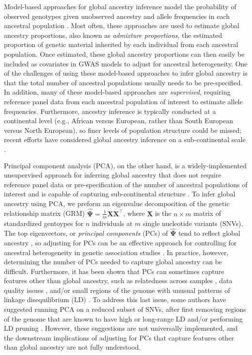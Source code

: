 \documentclass[12pt]{article}
\begin{document}
Model-based approaches for global ancestry inference model the probability of observed genotypes given unobserved ancestry and allele frequencies in each ancestral population \citep{structure, tang2005, admixture, finestructure}. 
Most often, these approaches are used to estimate global ancestry proportions, also known as \textit{admixture proportions}, the estimated proportion of genetic material inherited by each individual from each ancestral population. 
Once estimated, these global ancestry proportions can then easily be included as covariates in GWAS models to adjust for ancestral heterogeneity.
One of the challenges of using these model-based approaches to infer global ancestry is that the total number of ancestral populations usually needs to be pre-specified. 
In addition, many of these model-based approaches are \textit{supervised}, requiring reference panel data from each ancestral population of interest to estimate allele frequencies.
Furthermore, ancestry inference is typically conducted at a continental level (e.g., African versus European, rather than South European versus North European), so finer levels of population structure could be missed; recent efforts have considered global ancestry inference on a sub-continental scale \citep{finestructure, durand2014}.

Principal component analysis (PCA), on the other hand, is a widely-implemented unsupervised approach for inferring global ancestry that does not require reference panel data or pre-specification of the number of ancestral populations of interest and is capable of capturing sub-continental structure \citep{novembre2008}. 
To infer global ancestry using PCA, we preform an eigenvalue decomposition of the genetic relationship matrix (GRM) $\hat{\boldsymbol\Psi} = \frac{1}{m} \mathbf{X} \mathbf{X}^\top$, where $\mathbf{X}$ is the $n \times m$ matrix of standardized gentoypes for $n$ individuals at $m$ single nucleotide variants (SNVs).
The top eigenvectors, or \textit{principal components} (PCs) of $\hat{\boldsymbol\Psi}$ tend to reflect global ancestry \citep{patterson2006, mcvean2009}, so adjusting for PCs can be an effective approach for controlling for ancestral heterogeneity in genetic association studies \citep{eigenstrat}. 
In practice, however, determining the number of PCs needed to capture global ancestry can be difficult. 
Furthermore, it has been shown that PCs can sometimes capture features other than global ancestry, such as relatedness across samples \citep{patterson2006, conomos2015}, data quality issues \citep{eigenstrat, weale2010}, and/or small regions of the genome with unusual patterns of linkage disequilibrium (LD) \citep{tian2008, price2008}. 
To address this last issue, some authors have suggested running PCA on a reduced subset of SNVs, after first removing regions of the genome that are known to have high or long-range LD \citep{price2008} and/or performing LD pruning \citep{anderson2010, abdellaoui2013}. 
However, these suggestions are not universally implemented, and the downstream implications of adjusting for PCs that capture features other than global ancestry are not fully understood.
\end{document}
